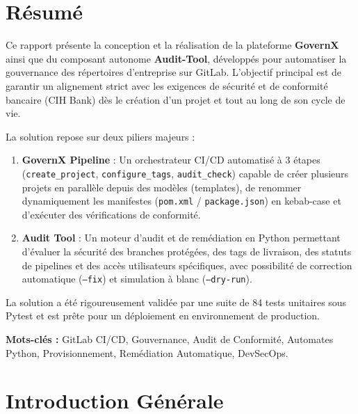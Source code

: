 \documentclass[12pt,a4paper]{report}
\begin{document}
\chapter*{Résumé}
Ce rapport présente la conception et la réalisation de la plateforme \textbf{GovernX} ainsi que du composant autonome \textbf{Audit-Tool}, développés pour automatiser la gouvernance des répertoires d'entreprise sur GitLab. L'objectif principal est de garantir un alignement strict avec les exigences de sécurité et de conformité bancaire (CIH Bank) dès le création d'un projet et tout au long de son cycle de vie.

La solution repose sur deux piliers majeurs :
\begin{enumerate}
    \item \textbf{GovernX Pipeline} : Un orchestrateur CI/CD automatisé à 3 étapes (\texttt{create\_project}, \texttt{configure\_tags}, \texttt{audit\_check}) capable de créer plusieurs projets en parallèle depuis des modèles (templates), de renommer dynamiquement les manifestes (\texttt{pom.xml} / \texttt{package.json}) en kebab-case et d'exécuter des vérifications de conformité.
    \item \textbf{Audit Tool} : Un moteur d'audit et de remédiation en Python permettant d'évaluer la sécurité des branches protégées, des tags de livraison, des statuts de pipelines et des accès utilisateurs spécifiques, avec possibilité de correction automatique (\texttt{--fix}) et simulation à blanc (\texttt{--dry-run}).
\end{enumerate}

La solution a été rigoureusement validée par une suite de 84 tests unitaires sous Pytest et est prête pour un déploiement en environnement de production.

\vspace{0.5cm}
\textbf{Mots-clés :} GitLab CI/CD, Gouvernance, Audit de Conformité, Automates Python, Provisionnement, Remédiation Automatique, DevSecOps.

\tableofcontents
\listoffigures
\listoftables

\chapter*{Introduction Générale}
\end{document}
